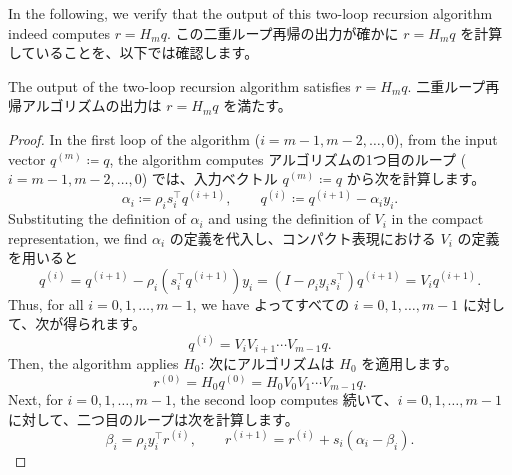 \documentclass[0_main]{subfiles}
\begin{document}


\ifEn
    In the following, we verify that the output of this two-loop recursion algorithm indeed computes $r = H_m q$.
\else
    この二重ループ再帰の出力が確かに $r = H_m q$ を計算していることを、以下では確認します。
\fi
\begin{proposition}
    \ifEn
        The output of the two-loop recursion algorithm satisfies $r = H_m q$.
    \else
        二重ループ再帰アルゴリズムの出力は $r = H_m q$ を満たす。
    \fi
\end{proposition}
\begin{proof}
    \ifEn
        In the first loop of the algorithm ($i = m-1, m-2, \dots, 0$), from the input vector $q^{(m)} \coloneqq q$, the algorithm computes
    \else
        アルゴリズムの1つ目のループ ($i = m-1, m-2, \dots, 0$) では、入力ベクトル $q^{(m)} \coloneqq q$ から次を計算します。
    \fi
    \begin{equation*}
        \alpha_i \coloneqq \rho_i s_i^\top q^{(i+1)}, \qquad
        q^{(i)} \coloneqq q^{(i+1)} - \alpha_i y_i.
    \end{equation*}
    \ifEn
        Substituting the definition of $\alpha_i$ and using the definition of $V_i$ in the compact representation, we find
    \else
        $\alpha_i$ の定義を代入し、コンパクト表現における $V_i$ の定義を用いると
    \fi
    \begin{equation*}
        q^{(i)} = q^{(i+1)} - \rho_i \left(s_i^\top q^{(i+1)}\right) y_i = \left(I - \rho_i y_i s_i^\top\right) q^{(i+1)} = V_i q^{(i+1)}.
    \end{equation*}
    \ifEn
        Thus, for all $i = 0, 1, \dots, m-1$, we have
    \else
        よってすべての $i = 0, 1, \dots, m-1$ に対して、次が得られます。
    \fi
    \begin{equation*}
        q^{(i)} = V_i V_{i+1} \cdots V_{m-1} q.
    \end{equation*}
    \ifEn
        Then, the algorithm applies $H_0$:
    \else
        次にアルゴリズムは $H_0$ を適用します。
    \fi
    \begin{equation*}
        r^{(0)} = H_0 q^{(0)} = H_0 V_0 V_1 \cdots V_{m-1} q.
    \end{equation*}
    \ifEn
        Next, for $i = 0, 1, \dots, m-1$, the second loop computes
    \else
        続いて、$i = 0, 1, \dots, m-1$ に対して、二つ目のループは次を計算します。
    \fi
    \begin{equation*}
        \beta_i     = \rho_i y_i^\top r^{(i)}, \qquad
        r^{(i+1)}   = r^{(i)} + s_i \left(\alpha_i - \beta_i\right).

\end{equation*}
\end{proof}
\end{document}
